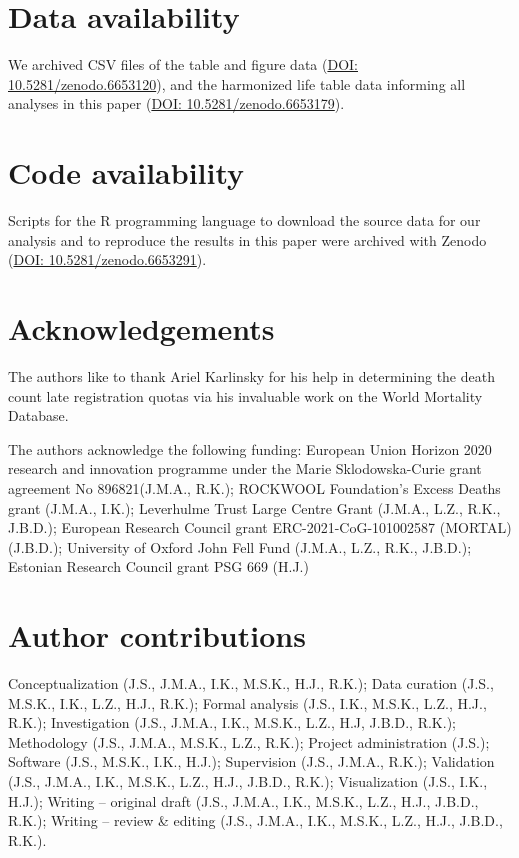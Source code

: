 \documentclass[12pt]{article}
\begin{document}
\clearpage

\section*{Data availability}

We archived CSV files of the table and figure data (\href{https://zenodo.org/record/6653120}{DOI: 10.5281/zenodo.6653120}), and the harmonized life table data informing all analyses in this paper (\href{https://zenodo.org/record/6653179}{DOI: 10.5281/zenodo.6653179}).

\section*{Code availability}

Scripts for the R programming language to download the source data for our analysis and to reproduce the results in this paper were archived with Zenodo (\href{https://zenodo.org/record/6653291}{DOI:  10.5281/zenodo.6653291}).

\section*{Acknowledgements}

The authors like to thank Ariel Karlinsky for his help in determining the death count late registration quotas via his invaluable work on the World Mortality Database.

The authors acknowledge the following funding: European Union Horizon 2020 research and innovation programme under the Marie Sklodowska-Curie grant agreement No 896821(J.M.A., R.K.); ROCKWOOL Foundation's Excess Deaths grant (J.M.A., I.K.); Leverhulme Trust Large Centre Grant (J.M.A., L.Z., R.K., J.B.D.); European Research Council grant ERC-2021-CoG-101002587 (MORTAL) (J.B.D.); University of Oxford John Fell Fund (J.M.A., L.Z., R.K., J.B.D.); Estonian Research Council grant PSG 669 (H.J.)

\section*{Author contributions}

Conceptualization (J.S., J.M.A., I.K., M.S.K., H.J., R.K.); Data curation (J.S., M.S.K., I.K., L.Z., H.J., R.K.); Formal analysis (J.S., I.K., M.S.K., L.Z., H.J., R.K.); Investigation (J.S., J.M.A., I.K., M.S.K., L.Z., H.J, J.B.D., R.K.); Methodology (J.S., J.M.A., M.S.K., L.Z., R.K.); Project administration (J.S.); Software (J.S., M.S.K., I.K., H.J.); Supervision (J.S., J.M.A., R.K.); Validation (J.S., J.M.A., I.K., M.S.K., L.Z., H.J., J.B.D., R.K.); Visualization (J.S., I.K., H.J.); Writing -- original draft (J.S., J.M.A., I.K., M.S.K., L.Z., H.J., J.B.D., R.K.); Writing -- review  \& editing (J.S., J.M.A., I.K., M.S.K., L.Z., H.J., J.B.D., R.K.).
\end{document}
